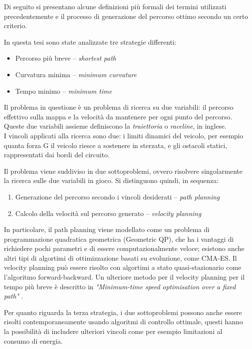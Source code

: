Di seguito si presentano alcune definizioni più formali dei termini utilizzati precedentemente e il
processo di generazione del percorso ottimo secondo un certo criterio.

\bigskip
\noindent In questa tesi sono state analizzate tre strategie differenti:
\begin{itemize}
	\setlength\itemsep{0em}
	\item Percorso più breve  -- \textit{shortest path}
	\item Curvatura minima -- \textit{minimum curvature}
	\item Tempo minimo -- \textit{minimum time}
\end{itemize}

\noindent Il problema in questione è un problema di ricerca su due variabili: il percorso effettivo sulla mappa e
la velocità da mantenere per ogni punto del percorso. Queste due variabili assieme definiscono la
\textit{traiettoria} o \textit{raceline}, in inglese.\\
I vincoli applicati alla ricerca sono due: i limiti dinamici del veicolo, per esempio quanta forza G il
veicolo riesce a sostenere in sterzata, e gli ostacoli statici, rappresentati dai bordi del circuito.

\bigskip
\noindent Il problema viene suddiviso in due sottoproblemi, ovvero risolvere singolarmente la ricerca sulle due
variabili in gioco. Si distinguono quindi, in sequenza:
\begin{enumerate}
\setlength\itemsep{0em}
\item Generazione del percorso secondo i vincoli desiderati -- \textit{path planning}
\item Calcolo della velocità sul percorso generato -- \textit{velocity planning}
\end{enumerate}
In particolare, il path planning viene modellato come un problema di programmazione quadratica geometrica
(Geometric QP), che ha i vantaggi di richiedere pochi parametri e di essere computazionalmente veloce;
esistono anche altri tipi di algortimi di ottimizzazione basati su evoluzione, come CMA-ES. Il velocity
planning può essere risolto con algortimi a stato quasi-stazionario come l'algoritmo forward-backward. Un
ulteriore metodo per il velocity planning per il tempo più breve è descritto in \textit{"Minimum-time
speed optimisation over a fixed path"} \cite{lipp2014minimum}.

Per quanto riguarda la terza strategia, i due sottoproblemi possono anche essere risolti contemporaneamente
usando algoritmi di controllo ottimale, questi hanno la possibilità di includere ulteriori vincoli come
per esempio limitazioni al consumo di energia.

